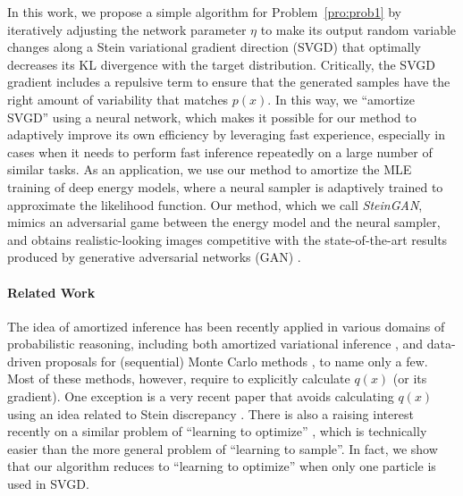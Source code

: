 \documentclass{article} %
\begin{document}
In this work, we propose a simple algorithm for Problem~\ref{pro:prob1} 
by iteratively adjusting the network parameter $\eta$ to make its output random variable changes along 
a Stein variational gradient direction (SVGD) \citep{liu2016stein} that optimally decreases its KL divergence 
with the target distribution. 
Critically, the SVGD gradient includes a repulsive term to ensure that the generated samples have the right amount of variability that matches $p(x).$ 
In this way, we ``amortize SVGD'' using a neural network, which makes it possible for our method to adaptively improve its own efficiency  
by leveraging fast experience, especially in cases when it needs to perform fast inference repeatedly on a large number of similar tasks. 
As an application, we use our method to amortize the MLE training of deep energy models, where a neural sampler is adaptively trained to 
approximate the likelihood function. Our method, which we call \emph{SteinGAN}, mimics an adversarial game 
between the energy model and the neural sampler, and obtains realistic-looking images competitive with the state-of-the-art results produced by generative adversarial networks (GAN) \citep{goodfellow2014generative, radford2015unsupervised}. 

\paragraph {Related Work} 
The idea of amortized inference \citep{gershman2014amortized}
 has been recently applied in various domains of probabilistic reasoning, 
 including both amortized variational inference \citep[e.g.,][]{kingma2013auto, jimenez2015variational}, 
and data-driven proposals for (sequential) Monte Carlo methods \citep[e.g.,][]{paige2016inference}, 
 to name only a few. Most of these methods, however, 
 require to explicitly calculate $q(x)$ (or its gradient). 
 One exception is a very recent paper \citep{operator} that avoids calculating $q(x)$ using an idea related to Stein discrepancy \citep{gorham2015measuring, liu2016kernelized, oates2014control, chwialkowski2016kernel}.
 There is also a raising interest recently on a similar problem of ``learning to optimize'' \citep[e.g.,][]{andrychowicz2016learning, daniel2016learning, li2016learning}, which is technically easier than the more general problem of ``learning to sample''. %
In fact, we show that our algorithm reduces to ``learning to optimize'' when only one particle is used in SVGD. 
\end{document}
